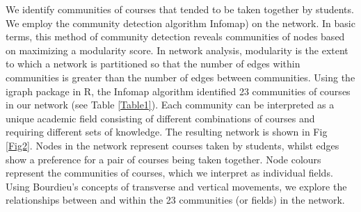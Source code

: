 We identify communities of courses that tended to be taken together by students. We employ the community detection algorithm Infomap\cite{Edler_2017}) on the network. In basic terms, this method of community detection reveals communities of nodes based on maximizing a modularity score. In network analysis, modularity is the extent to which a network is partitioned so that the number of edges within communities is greater than the number of edges between communities. Using the igraph package in R\cite{csardi2006igraph}, the Infomap algorithm identified 23 communities of courses in our network (see Table \ref{Table1}). Each community can be interpreted as a unique academic field consisting of different combinations of courses and requiring different sets of knowledge. The resulting network is shown in Fig \ref{Fig2}. Nodes in the network represent courses taken by students, whilst edges show a preference for a pair of courses being taken together. Node colours represent the communities of courses, which we interpret as individual fields. Using Bourdieu's concepts of transverse and vertical movements, we explore the relationships between and within the 23 communities (or fields) in the network.

\begin{figure*}[!ht]
\centering
\caption{\textbf{Student Course Network.\newline} 
A network representing the communities, or fields, of courses formed by students co-enrolling in course at the University of Auckland. Each node represents a course offered by the university, while links between nodes indicate instances where students took those two courses together within their undergraduate degree. Node colour indicates the community that a course belongs to. Communities were revealed in a two step process. Firstly, edges were filtered so only those with an RCP value over 1 were included. Secondly, the Map Equation software package\cite{Edler_2017} was used to partition the network into communities of courses, which can be interpreted as the underlying academic fields. The revealed fields are labeled in Fig \ref{Fig3}, and represent the various academic fields that students in our sample were enrolled in.}
\label{Fig2}
\end{figure*}


